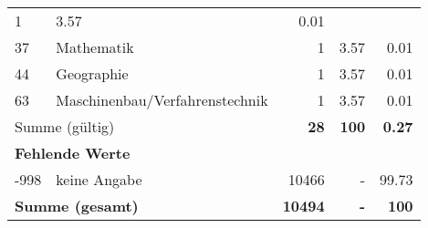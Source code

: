 \begin{longtable}{lXrrr}
       \num{1} &
       \num[round-mode=places,round-precision=2]{3.57} &
         \num[round-mode=places,round-precision=2]{0.01} \\

     37 &
     \multicolumn{1}{X}{ Mathematik   } &


       \num{1} &
       \num[round-mode=places,round-precision=2]{3.57} &
         \num[round-mode=places,round-precision=2]{0.01} \\

     44 &
     \multicolumn{1}{X}{ Geographie   } &


       \num{1} &
       \num[round-mode=places,round-precision=2]{3.57} &
         \num[round-mode=places,round-precision=2]{0.01} \\

     63 &
     \multicolumn{1}{X}{ Maschinenbau/Verfahrenstechnik   } &


       \num{1} &
       \num[round-mode=places,round-precision=2]{3.57} &
         \num[round-mode=places,round-precision=2]{0.01} \\
     \midrule
     \multicolumn{2}{l}{Summe (gültig)} &
       \textbf{\num{28}} &
     \textbf{\num{100}} &
       \textbf{\num[round-mode=places,round-precision=2]{0.27}} \\
     \multicolumn{5}{l}{\textbf{Fehlende Werte}}\\
       -998 &
       keine Angabe &
         \num{10466} &
        - &
         \num[round-mode=places,round-precision=2]{99.73} \\
     \midrule
     \multicolumn{2}{l}{\textbf{Summe (gesamt)}} &
          \textbf{\num{10494}} &
        \textbf{-} &
        \textbf{\num{100}} \\
     \bottomrule
     \end{longtable}
     

